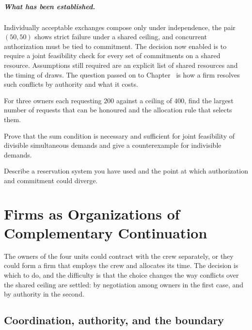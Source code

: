 \paragraph{What has been established.} Individually acceptable exchanges compose only under independence, the pair $(50,50)$ shows strict failure under a shared ceiling, and concurrent authorization must be tied to commitment. The decision now enabled is to require a joint feasibility check for every set of commitments on a shared resource. Assumptions still required are an explicit list of shared resources and the timing of draws. The question passed on to Chapter~ is how a firm resolves such conflicts by authority and what it costs.

\begin{exercise}
For three owners each requesting $200$ against a ceiling of $400$, find the largest number of requests that can be honoured and the allocation rule that selects them.
\end{exercise}
\begin{exercise}
Prove that the sum condition is necessary and sufficient for joint feasibility of divisible simultaneous demands and give a counterexample for indivisible demands.
\end{exercise}
\begin{exercise}
Describe a reservation system you have used and the point at which authorization and commitment could diverge.
\end{exercise}

\chapter{Firms as Organizations of Complementary Continuation}\label{ch:32}

The owners of the four units could contract with the crew separately, or they could form a firm that employs the crew and allocates its time. The decision is which to do, and the difficulty is that the choice changes the way conflicts over the shared ceiling are settled: by negotiation among owners in the first case, and by authority in the second.

\section{Coordination, authority, and the boundary}

